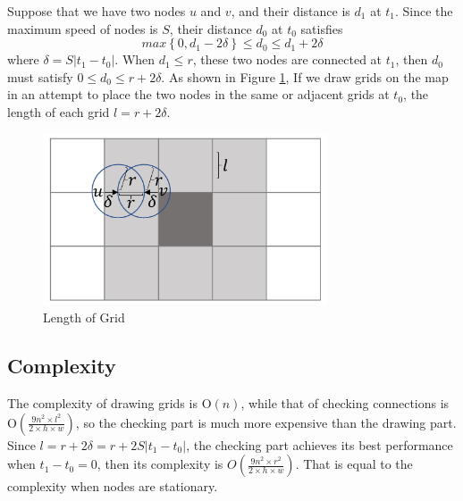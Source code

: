 Suppose that we have two nodes $u$ and $v$, and their distance is $d_1$ at $t_1$. Since the maximum speed of nodes is $S$, their distance $d_0$ at $t_0$ satisfies
\[max\left\{0,d_1-2\delta \right\}\le d_0\le d_1+2\delta \] 
where $\delta =S\left|t_1-t_0\right|$. When $d_1\le r$, these two nodes are connected at $t_1$, then $d_0$ must satisfy $0\le d_0\le r+2\delta $. As shown in Figure \ref{fig:F54LengthofGrid}, If we draw grids on the map in an attempt to place the two nodes in the same or adjacent grids at $t_0$, the length of each grid $l=r+2\delta $.

\begin{figure} [hbtp]
  \centering 
  \includegraphics[height=2in]{figures/F54LengthofGrid.png}
  \caption{Length of Grid} 
  \label{fig:F54LengthofGrid} %
\end{figure}

\subsection{Complexity}

\noindent The complexity of drawing grids is $\mathrm{O}\left(n\right)$, while that of checking connections is $\mathrm{O}\left(\frac{9n^2\times l^2}{2\times h\times w}\right)$, so the checking part is much more expensive than the drawing part. Since $l=r+2\delta =r+2S\left|t_1-t_0\right|$, the checking part achieves its best performance when $t_1-t_0=0$, then its complexity is $O\left(\frac{9n^2\times r^2}{2\times h\times w}\right)$. That is equal to the complexity when nodes are stationary.
















